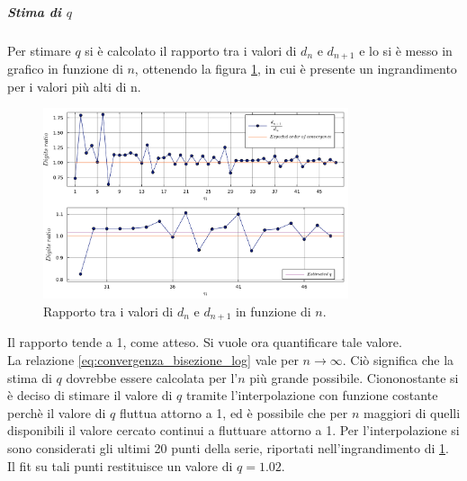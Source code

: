 \documentclass[letterpaper, 12pt]{article}
\begin{document}
\subparagraph{Stima di $q$} Per stimare $q$ si è calcolato il rapporto tra i valori di $d_n$ e $d_{n+1}$ e lo si
è messo in grafico in funzione di $n$, ottenendo la figura \ref{fig:es3_2_2_2}, in cui è presente un ingrandimento
per i valori più alti di n.
\begin{figure}[!ht]
    \centering
    \includegraphics[width=0.8\textwidth]{3222.pdf}
    \caption{Rapporto tra i valori di $d_n$ e $d_{n+1}$ in funzione di $n$.}
    \label{fig:es3_2_2_2}
\end{figure}

Il rapporto tende a 1, come atteso. Si vuole ora quantificare tale valore. \\
La relazione \ref{eq:convergenza_bisezione_log} vale per $n\to\infty$. Ciò significa che la stima di $q$
dovrebbe essere calcolata per l'$n$ più grande possibile. Ciononostante si
è deciso di stimare il valore di $q$ tramite l'interpolazione con funzione costante perchè il valore di $q$ 
fluttua attorno a 1, ed è possibile che per $n$ maggiori di quelli disponibili il valore cercato continui a 
fluttuare attorno a 1. Per l'interpolazione si sono considerati gli ultimi 20 punti della serie, riportati 
nell'ingrandimento di \ref{fig:es3_2_2_2}. Il fit su tali punti restituisce
un valore di $q = 1.02$. \\  
\end{document}
